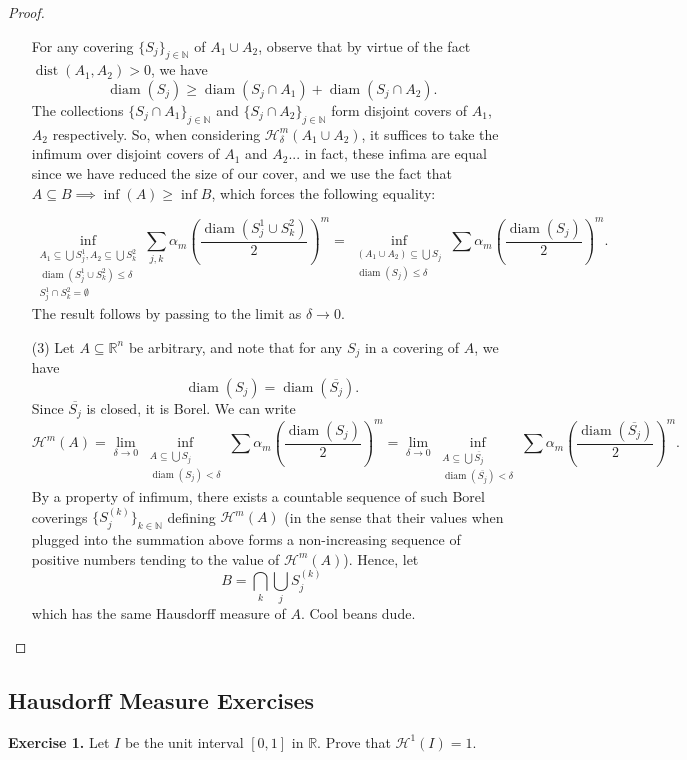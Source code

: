 \documentclass[10pt]{article}
\theoremstyle{plain}
\DeclareMathOperator{\diam}{diam}
\DeclareMathOperator{\dist}{dist}
\begin{document}
\begin{proof}
\begin{itemize}
			For any covering $\{S_j\}_{j \in \mathbb{N}}$ of $A_1 \cup A_2$, observe that by virtue of the fact $\dist(A_1, A_2) > 0$, we have $$\diam(S_j) \geq \diam(S_j \cap A_1) + \diam(S_j \cap A_2).$$ The collections $\{S_j \cap A_1\}_{j \in \mathbb{N}}$ and $\{S_j \cap A_2\}_{j \in \mathbb{N}}$ form disjoint covers of $A_1$, $A_2$ respectively. So, when considering $\mathcal{H}_\delta^m(A_1 \cup A_2)$, it suffices to take the infimum over disjoint covers of $A_1$ and $A_2$... in fact, these infima are equal since we have reduced the size of our cover, and we use the fact that $ A \subseteq B \implies \inf(A) \geq \inf B$, which forces the following equality: 
			
			$$\inf_{\substack{A_1 \subseteq \bigcup S_j^1, A_2 \subseteq \bigcup S_k^2 \\ \boxed{\diam(S_j^1 \cup S_k^2) \leq \delta }  \\ S_j^1 \cap S_k^2 = \emptyset}} \sum_{j, k} \alpha_m  \left(\frac{\diam(S_j^1 \cup S_k^2)}{2}\right)^m = \inf_{\substack{(A_1 \cup A_2) \subseteq \bigcup S_j \\ \diam(S_j) \leq \delta}} \sum \alpha_m \left(\frac{\diam(S_j)}{2}\right)^m.$$ The result follows by passing to the limit as $\delta \to 0$. 
			
			\item[(3)]  Let $A \subseteq \mathbb{R}^n$ be arbitrary, and note that for any $S_j$ in a covering of $A$, we have $$\diam(S_j) = \diam(\overline{S_j}).$$ Since $\overline{S_j}$ is closed, it is Borel. We can write $$\mathcal{H}^m(A) = \lim_{\delta \to 0} \inf_{\substack{A \subseteq \bigcup S_j \\ \diam(S_j) < \delta}} \sum \alpha_m \left(\frac{\diam(S_j)}{2}\right)^m = \lim_{\delta \to 0} \inf_{\substack{A \subseteq \bigcup \overline{S_j} \\ \diam(\overline{S_j}) < \delta}} \sum \alpha_m \left(\frac{\diam(\overline{S_j})}{2}\right)^m.$$ 
			By a property of infimum, there exists a countable sequence of such Borel coverings $\{S_j^{(k)}\}_{k \in \mathbb{N}}$ defining $\mathcal{H}^m(A)$ (in the sense that their values when plugged into the summation above forms a non-increasing sequence of positive numbers tending to the value of $\mathcal{H}^m(A)$). Hence, let $$B = \bigcap_k \bigcup_j S_j^{(k)}$$ which has the same Hausdorff measure of $A$. Cool beans dude. 
		\end{itemize}
	\end{proof}

\subsection*{Hausdorff Measure Exercises}
	\noindent \textbf{Exercise 1.} Let $I$ be the unit interval $[0, 1]$ in $\mathbb{R}$. Prove that $\mathcal{H}^1(I) = 1$. 
	
\end{document}

